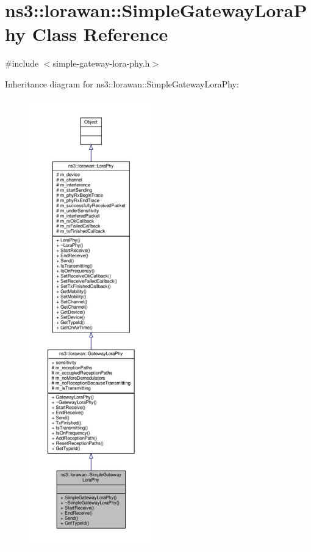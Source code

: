 \hypertarget{classns3_1_1lorawan_1_1SimpleGatewayLoraPhy}{}\section{ns3\+:\+:lorawan\+:\+:Simple\+Gateway\+Lora\+Phy Class Reference}
\label{classns3_1_1lorawan_1_1SimpleGatewayLoraPhy}


{\ttfamily \#include $<$simple-\/gateway-\/lora-\/phy.\+h$>$}



Inheritance diagram for ns3\+:\+:lorawan\+:\+:Simple\+Gateway\+Lora\+Phy\+:
\nopagebreak
\begin{figure}[H]
\begin{center}
\leavevmode
\includegraphics[height=550pt]{classns3_1_1lorawan_1_1SimpleGatewayLoraPhy__inherit__graph}
\end{center}
\end{figure}


